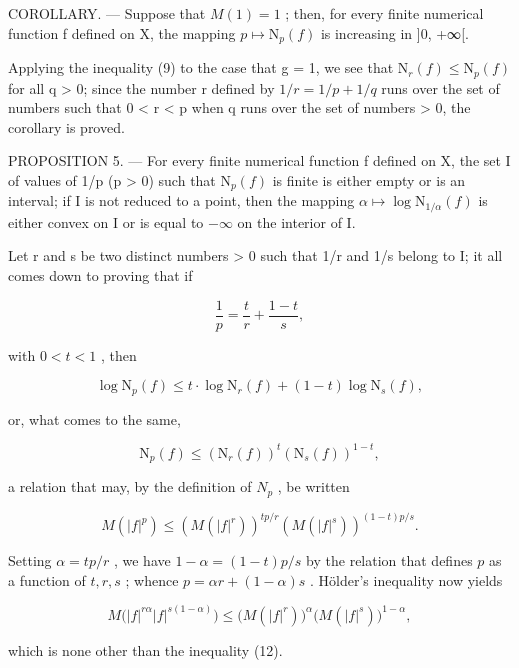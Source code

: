COROLLARY. --- Suppose that \(M(1) = 1\) ; then, for every finite numerical function f defined on X, the mapping \(p \mapsto \mathrm{N}_{p}(f)\) is increasing in {]}0, +∞{[}.

Applying the inequality (9) to the case that g = 1, we see that \(\mathrm{N}_{r}(f) \leqslant \mathrm{N}_{p}(f)\) for all q \textgreater{} 0; since the number r defined by \(1/r = 1/p + 1/q\) runs over the set of numbers such that 0 < r < p when q runs over the set of numbers \textgreater{} 0, the corollary is proved.

PROPOSITION 5. --- For every finite numerical function f defined on X, the set I of values of 1/p (p \textgreater{} 0) such that \(\mathrm{N}_{p}(f)\) is finite is either empty or is an interval; if I is not reduced to a point, then the mapping \(\alpha \mapsto \log \mathrm{N}_{1/\alpha}(f)\) is either convex on I or is equal to \(-\infty\) on the interior of I.

Let r and s be two distinct numbers \textgreater{} 0 such that 1/r and 1/s belong to I; it all comes down to proving that if

\[
{\frac {1}{p}} = {\frac {t}{r}} + {\frac {1 - t}{s}},
\]

with \(0 < t < 1\) , then

\[
\log \mathrm{N} _ {p} (f) \leqslant t \cdot \log \mathrm{N} _ {r} (f) + (1 - t) \log \mathrm{N} _ {s} (f),\tag{10}
\]

or, what comes to the same,

\[
\mathrm{N} _ {p} (f) \leqslant \left(\mathrm{N} _ {r} (f)\right) ^ {t} \left(\mathrm{N} _ {s} (f)\right) ^ {1 - t},\tag{11}
\]

a relation that may, by the definition of \(N_{p}\) , be written

\[
M (| f | ^ {p}) \leqslant \left(M (| f | ^ {r})\right) ^ {t p / r} \left(M (| f | ^ {s})\right) ^ {(1 - t) p / s}.\tag{12}
\]

Setting \(\alpha = tp / r\) , we have \(1 - \alpha = (1 - t)p / s\) by the relation that defines \(p\) as a function of \(t, r, s\) ; whence \(p = \alpha r + (1 - \alpha)s\) . Hölder's inequality now yields

\[
M \big (| f | ^ {r \alpha} | f | ^ {s (1 - \alpha)} \big) \leqslant \big (M (| f | ^ {r}) \big) ^ {\alpha} \big (M (| f | ^ {s}) \big) ^ {1 - \alpha},
\]

which is none other than the inequality (12).

